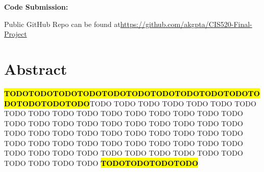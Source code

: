 \documentclass{article}
\newcommand{\TODO}{\textcolor{red}{\textbf{\hl{TODO}}}}
\begin{document}
\vspace{12pt}

\textbf{Code Submission:}

\normalsize{Public GitHub Repo can be found at\href{https://github.com/akgpta/CIS520-Final-Project}{https://github.com/akgpta/CIS520-Final-Project}}



\newpage
\tableofcontents
\newpage

\section{Abstract}
\TODO\TODO\TODO\TODO\TODO\TODO\TODO\TODO\TODO\TODO\TODO\TODO\TODO\TODO TODO TODO TODO TODO TODO TODO TODO TODO TODO TODO TODO TODO TODO TODO TODO TODO TODO TODO TODO TODO TODO TODO TODO TODO TODO TODO TODO TODO TODO TODO TODO TODO TODO TODO TODO TODO TODO TODO TODO TODO TODO TODO TODO TODO TODO TODO TODO TODO TODO TODO TODO TODO TODO TODO TODO TODO TODO TODO TODO TODO TODO \TODO\TODO\TODO\TODO
\end{document}
